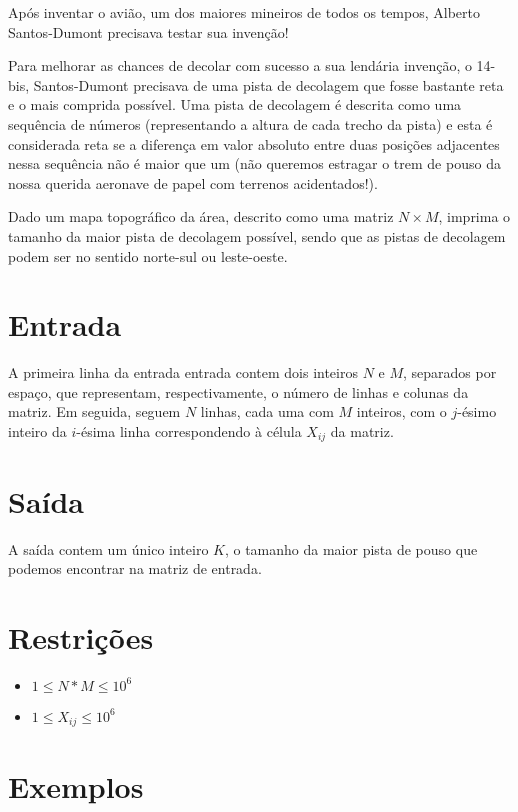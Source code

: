 Após inventar o avião, um dos maiores mineiros de todos os tempos, Alberto Santos-Dumont precisava testar sua invenção!

Para melhorar as chances de decolar com sucesso a sua lendária invenção, o 14-bis, Santos-Dumont precisava de uma pista de decolagem
que fosse bastante reta e o mais comprida possível. Uma pista de decolagem é descrita como uma sequência de números (representando a altura
de cada trecho da pista) e esta é considerada reta se a diferença em valor absoluto entre duas posições adjacentes nessa sequência não é maior
que um (não queremos estragar o trem de pouso da nossa querida aeronave de papel com terrenos acidentados!).

Dado um mapa topográfico da área, descrito como uma matriz $N \times M$, imprima o tamanho da maior pista de decolagem possível,
sendo que as pistas de decolagem podem ser no sentido norte-sul ou leste-oeste.

\section*{Entrada}

A primeira linha da entrada entrada contem dois inteiros $N$ e $M$, separados por espaço, que representam, respectivamente,
o número de linhas e colunas da matriz. Em seguida, seguem $N$ linhas, cada uma com $M$ inteiros, com o $j$-ésimo inteiro da $i$-ésima linha
correspondendo à célula $X_{ij}$ da matriz.

\section*{Saída}

A saída contem um único inteiro $K$, o tamanho da maior pista de pouso que podemos encontrar na matriz de entrada.

\section*{Restrições}

\begin{itemize}
    \item $1 \leq N * M \leq 10^6$
    \item $1 \leq X_{ij} \leq 10^6$
\end{itemize}


\section*{Exemplos}

\exemplo
